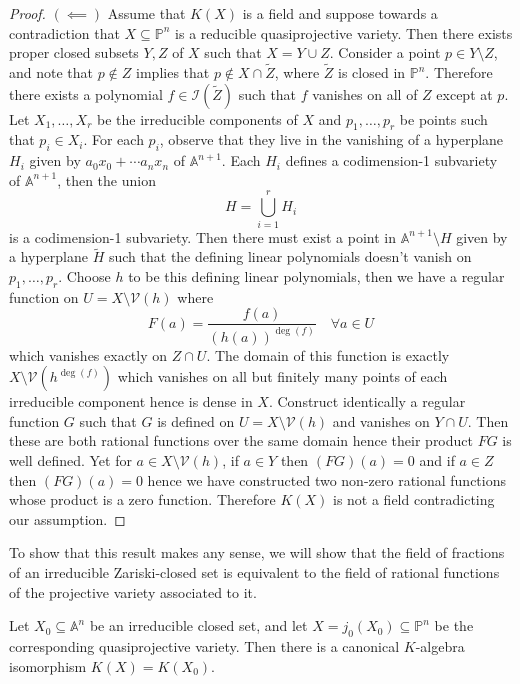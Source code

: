 \documentclass[40pt]{article}
\newcommand{\Proj}{\mathbb{P}}
\newcommand{\A}{\mathbb{A}}
\newcommand{\I}{\mathcal{I}}
\newcommand{\V}{\mathcal{V}}
\theoremstyle{remark}
\begin{document}
\begin{proof}
			$(\impliedby)$ Assume that $K(X)$ is a field and suppose towards a contradiction that $X \subseteq \Proj^n $ is a reducible quasiprojective variety. Then there exists proper closed subsets $Y,Z$ of $X$ such that $X = Y \cup Z$. Consider a point $p \in Y \setminus Z$, and note that $p \not \in Z$ implies that $p \not \in X \cap \tilde Z$, where $\tilde Z$ is closed in $\Proj^n$. Therefore there exists a polynomial $f \in \I(\tilde Z)$ such that $f$ vanishes on all of $Z$ except at $p$. Let $X_1,\dots,X_r$ be the irreducible components of $X$ and $p_1,\dots,p_r$ be points such that $p_i \in X_i$. For each $p_i$, observe that they live in the vanishing of a hyperplane $H_i$ given by $a_0x_0+\cdots a_nx_n$ of $\A^{n+1}$. Each $H_i$ defines a codimension-1 subvariety of $\A^{n+1}$, then the union 
			\[
			H = \bigcup_{i=1}^r H_i
			\]
			is a codimension-1 subvariety. Then there must exist a point in $\A^{n+1}\setminus H$ given by a hyperplane $\tilde H$ such that the defining linear polynomials doesn't vanish on $p_1,\dots,p_r$. Choose $h$ to be this defining linear polynomials, then we have a regular function on $U = X \setminus \V(h)$ where 
			\[
			F(a) = \frac{f(a)}{(h(a))^{\deg(f)}} \quad \forall a \in U
			\]
			which vanishes exactly on $Z \cap U$. The domain of this function is exactly $X \setminus \V(h^{\deg(f)})$ which vanishes on all but finitely many points of each irreducible component hence is dense in $X$. Construct identically a regular function $G$ such that $G$ is defined on $U = X \setminus \V(h)$ and vanishes on $Y \cap U$. Then these are both rational functions over the same domain hence their product $FG$ is well defined. Yet for $a \in X \setminus \V(h)$, if $a \in Y$ then $(FG)(a) = 0$ and if $a \in Z$ then $(FG)(a) = 0$ hence we have constructed two non-zero rational functions whose product is a zero function. Therefore $K(X)$ is not a field contradicting our assumption. 
		\end{proof}
		To show that this result makes any sense, we will show that the field of fractions of an irreducible Zariski-closed set is equivalent to the field of rational functions of the projective variety associated to it. 
		\begin{prop}
			Let $X_0 \subseteq \A^n$ be an irreducible closed set, and let $X = j_0(X_0) \subseteq \Proj^n$ be the corresponding quasiprojective variety. Then there is a canonical $K$-algebra isomorphism $K(X) = K(X_0)$. 
		\end{prop}
\end{document}
